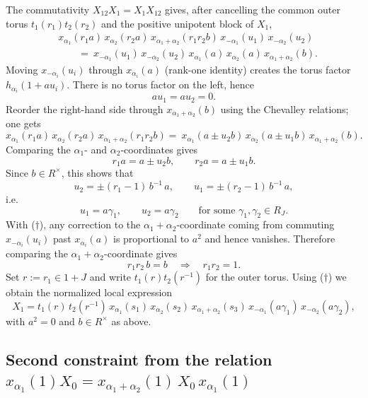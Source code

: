 \documentclass[]{jgcc}
\numberwithin{equation}{section}
\begin{document}
The commutativity $X_{12}X_1=X_1X_{12}$ gives, after cancelling the common outer torus $t_1(r_1)t_2(r_2)$ and the positive unipotent block of $X_1$,
\begin{align*}
&x_{\alpha_1}(r_1a)\,x_{\alpha_2}(r_2a)\,x_{\alpha_1+\alpha_2}(r_1r_2b)\,x_{-\alpha_1}(u_1)\,x_{-\alpha_2}(u_2)\\
&\qquad=\ x_{-\alpha_1}(u_1)\,x_{-\alpha_2}(u_2)\,x_{\alpha_1}(a)\,x_{\alpha_2}(a)\,x_{\alpha_1+\alpha_2}(b).
\end{align*}
Moving $x_{-\alpha_i}(u_i)$ through $x_{\alpha_i}(a)$ (rank-one identity) creates the torus factor $h_{\alpha_i}(1+au_i)$.
There is no torus factor on the left, hence
\[
au_1=au_2=0. \tag{$\ast$}
\]
Reorder the right-hand side through $x_{\alpha_1+\alpha_2}(b)$ using the Chevalley relations; one gets
\[
x_{\alpha_1}(r_1a)\,x_{\alpha_2}(r_2a)\,x_{\alpha_1+\alpha_2}(r_1r_2b)
=\ x_{\alpha_1}(a\pm u_2 b)\,x_{\alpha_2}(a\pm u_1 b)\,x_{\alpha_1+\alpha_2}(b).
\]
Comparing the $\alpha_1$- and $\alpha_2$-coordinates gives
\[
r_1a=a\pm u_2 b,\qquad r_2a=a\pm u_1 b.
\]
Since $b\in R^\times$, this shows that
\[
u_2=\pm (r_1-1)\,b^{-1}\,a,\qquad u_1=\pm (r_2-1)\,b^{-1}\,a,
\]
i.e.
\[
u_1=a\gamma_1,\qquad u_2=a\gamma_2\qquad\text{for some }\gamma_1,\gamma_2\in R_J. \tag{$\dagger$}
\]
With \textup{($\dagger$)}, any correction to the $\alpha_1+\alpha_2$-coordinate coming from commuting $x_{-\alpha_i}(u_i)$ past $x_{\alpha_i}(a)$ is proportional to $a^2$ and hence vanishes.
Therefore comparing the $\alpha_1+\alpha_2$-coordinate gives
\[
r_1r_2\,b=b\quad\Longrightarrow\quad r_1r_2=1.
\]
Set $r:=r_1\in 1+J$ and write $t_1(r)t_2(r^{-1})$ for the outer torus.
Using \textup{($\dagger$)} we obtain the normalized local expression
\[
X_1
= t_1(r)\,t_2(r^{-1})\,
x_{\alpha_1}(s_1)\,x_{\alpha_2}(s_2)\,x_{\alpha_1+\alpha_2}(s_3)\,
x_{-\alpha_1}(a\gamma_1)\,x_{-\alpha_2}(a\gamma_2),
\]
with $a^2=0$ and $b\in R^\times$ as above.

\subsection{\texorpdfstring{Second constraint from the relation $x_{\alpha_1}(1)X_0=x_{\alpha_1+\alpha_2}(1)\,X_0\,x_{\alpha_1}(1)$}{Second constraint from the relation xalpha1(1)X0=xalpha1+alpha2(1)X0xalpha1(1)}}\label{subsec:second-constraint}
\end{document}
